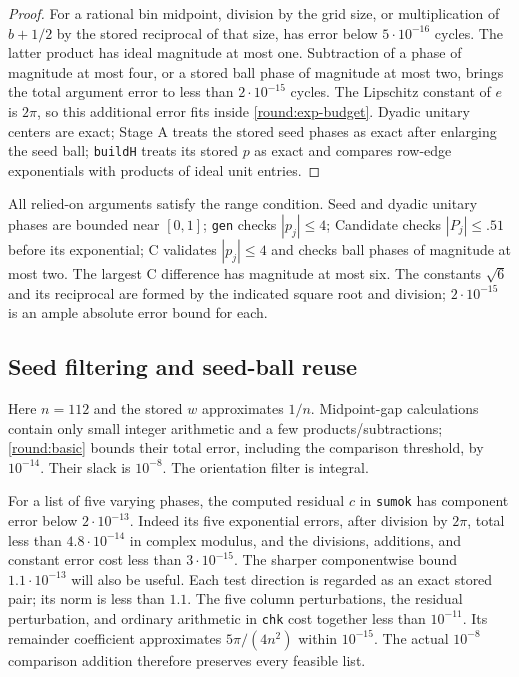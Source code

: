 \begin{proof}
For a rational bin midpoint, division by the grid size, or multiplication
of $b+1/2$ by the stored reciprocal of that size, has error below
$5\cdot10^{-16}$ cycles.  The latter product has ideal magnitude at
most one.  Subtraction of a phase of magnitude at most four, or a
stored ball phase of magnitude at most two, brings the total argument
error to less than $2\cdot10^{-15}$ cycles.  The Lipschitz constant of
$e$ is $2\pi$, so this additional error fits inside
\eqref{round:exp-budget}.  Dyadic unitary centers are exact; Stage A
treats the stored seed phases as exact after enlarging the seed ball;
\texttt{buildH} treats its stored $p$ as exact and compares row-edge
exponentials with products of ideal unit entries.
\end{proof}

All relied-on arguments satisfy the range condition.  Seed and dyadic
unitary phases are bounded near $[0,1]$; \texttt{gen} checks $|p_j|\le4$;
Candidate checks $|P_j|\le.51$ before its exponential; C validates
$|p_j|\le4$ and checks ball phases of magnitude at most two.
The largest C difference has magnitude at most six.  The constants
$\sqrt6$ and its reciprocal are formed by the indicated square root
and division; $2\cdot10^{-15}$ is an ample absolute error bound for each.

\subsection{Seed filtering and seed-ball reuse}
\label{round:seed}

Here $n=112$ and the stored $w$ approximates $1/n$.
Midpoint-gap calculations contain only small integer arithmetic and
a few products/subtractions; \eqref{round:basic} bounds their total
error, including the comparison threshold, by $10^{-14}$.
Their slack is $10^{-8}$.  The orientation filter is integral.

For a list of five varying phases, the computed residual $c$ in
\texttt{sumok} has component error below $2\cdot10^{-13}$.
Indeed its five exponential errors, after division by $2\pi$, total
less than $4.8\cdot10^{-14}$ in complex modulus, and the divisions,
additions, and constant error cost less than $3\cdot10^{-15}$.
The sharper componentwise bound $1.1\cdot10^{-13}$ will also be useful.
Each test direction is regarded as an exact stored pair; its norm is
less than $1.1$.  The five column perturbations, the residual
perturbation, and ordinary arithmetic in \texttt{chk} cost together
less than $10^{-11}$.  Its remainder coefficient approximates
$5\pi/(4n^2)$ within $10^{-15}$.  The actual $10^{-8}$ comparison
addition therefore preserves every feasible list.

